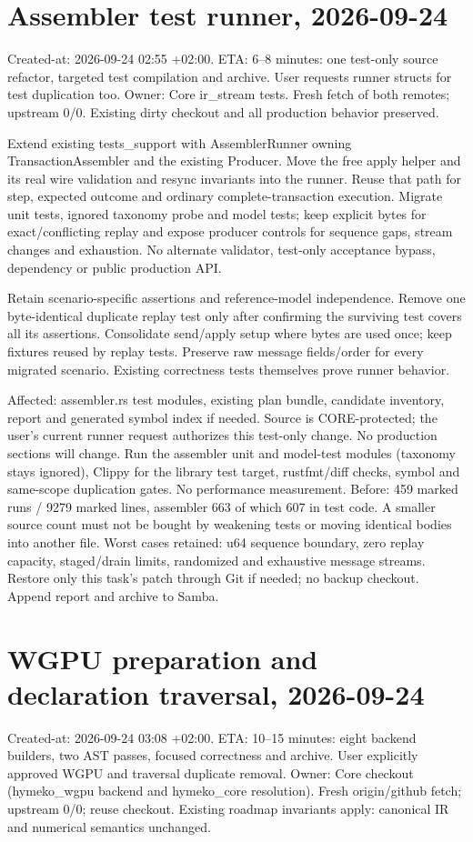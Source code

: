 \documentclass[11pt,a4paper]{article}
\begin{document}
\section*{Assembler test runner, 2026-09-24}
Created-at: 2026-09-24 02:55 +02:00. ETA: 6--8 minutes: one test-only source
refactor, targeted test compilation and archive. User requests runner structs for
test duplication too. Owner: Core ir\_stream tests. Fresh fetch of both remotes;
upstream 0/0. Existing dirty checkout and all production behavior preserved.

Extend existing tests\_support with AssemblerRunner owning TransactionAssembler
and the existing Producer. Move the free apply helper and its real wire validation
and resync invariants into the runner. Reuse that path for step, expected outcome
and ordinary complete-transaction execution. Migrate unit tests, ignored taxonomy
probe and model tests; keep explicit bytes for exact/conflicting replay and expose
producer controls for sequence gaps, stream changes and exhaustion. No alternate
validator, test-only acceptance bypass, dependency or public production API.

Retain scenario-specific assertions and reference-model independence. Remove one
byte-identical duplicate replay test only after confirming the surviving test
covers all its assertions. Consolidate send/apply setup where bytes are used once;
keep fixtures reused by replay tests. Preserve raw message fields/order for every
migrated scenario. Existing correctness tests themselves prove runner behavior.

Affected: assembler.rs test modules, existing plan bundle, candidate inventory,
report and generated symbol index if needed. Source is CORE-protected; the user's
current runner request authorizes this test-only change. No production sections
will change. Run the assembler unit and model-test modules (taxonomy stays ignored),
Clippy for the library test target, rustfmt/diff checks, symbol and same-scope
duplication gates. No performance measurement. Before: 459 marked runs / 9279
marked lines, assembler 663 of which 607 in test code. A smaller source count must
not be bought by weakening tests or moving identical bodies into another file.
Worst cases retained: u64 sequence boundary, zero replay capacity, staged/drain
limits, randomized and exhaustive message streams. Restore only this task's patch
through Git if needed; no backup checkout. Append report and archive to Samba.
\section*{WGPU preparation and declaration traversal, 2026-09-24}
Created-at: 2026-09-24 03:08 +02:00. ETA: 10--15 minutes: eight backend builders,
two AST passes, focused correctness and archive. User explicitly approved WGPU
and traversal duplicate removal. Owner: Core checkout (hymeko\_wgpu backend and
hymeko\_core resolution). Fresh origin/github fetch; upstream 0/0; reuse checkout.
Existing roadmap invariants apply: canonical IR and numerical semantics unchanged.
\end{document}
